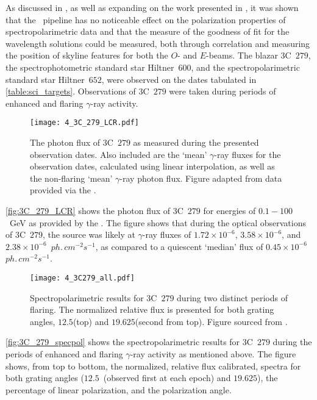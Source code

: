 As discussed in \cite[][see also \autoref{app:papers}]{Cooper_HEASA2022}, as well as expanding on the work presented in \cite{Cooper_HEASA2021}, it was shown that the \stops\ pipeline has no noticeable effect on the polarization properties of spectropolarimetric data and that the measure of the goodness of fit for the wavelength solutions could be measured, both through correlation and measuring the position of skyline features for both the $O$- and $E$-beams.
The blazar 3C~$279$, the spectrophotometric standard star Hiltner~$600$, and the spectropolarimetric standard star Hiltner~$652$, were observed on the dates tabulated in \autoref{table:sci_targets}.
Observations of 3C~$279$ were taken during periods of enhanced and flaring $\gamma$-ray activity.

\begin{figure}[t]
    \centering
    \texttt{[image: 4\_3C\_279\_LCR.pdf]}
    \caption{The photon flux of 3C~$279$ as measured during the presented observation dates. Also included are the `mean' $\gamma$-ray fluxes for the observation dates, calculated using linear interpolation, as well as the non-flaring `mean' $\gamma$-ray photon flux. Figure adapted from data provided via the .\protect\footnotemark}
    \label{fig:3C_279_LCR}
\end{figure}

\autoref{fig:3C_279_LCR} shows the photon flux of 3C~$279$ for energies of $0.1 - 100$~GeV as provided by the  \citep{FermiLCR}.
The figure shows that during the optical observations of 3C~$279$, the source was likely at $\gamma$-ray fluxes of $1.72 \times 10^{-6}$, $3.58 \times 10^{-6}$, and $2.38 \times 10^{-6}$~$ph.\,cm^{-2}s^{-1}$, as compared to a quiescent `median' flux of $0.45 \times 10^{-6}$~$ph.\,cm^{-2}s^{-1}$.

\begin{figure}[t]
    \centering
    \texttt{[image: 4\_3C279\_all.pdf]}
    \caption{Spectropolarimetric results for 3C~$279$ during two distinct periods of flaring. The normalized relative flux is presented for both grating angles, $12.5$\degree (top) and $19.625$\degree (second from top). Figure sourced from \citep{Cooper_HEASA2022}.}
    \label{fig:3C_279_specpol}
\end{figure}

\autoref{fig:3C_279_specpol} shows the spectropolarimetric results for 3C~$279$ during the periods of enhanced and flaring $\gamma$-ray activity as mentioned above.
The figure shows, from top to bottom, the normalized, relative flux calibrated, spectra for both grating angles ($12.5$\degree\ (observed first at each epoch) and $19.625$\degree), the percentage of linear polarization, and the polarization angle.

